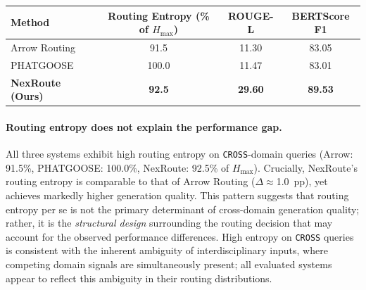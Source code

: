 \documentclass[a4paper,fleql]{cas-sc}
\begin{document}
\vspace{6pt plus 4pt minus 3pt}
\begin{center}
\begingroup
{}
\label{tab:moe_routing}
\renewcommand{\arraystretch}{1.3}
\begin{tabular}{lccc}
\toprule
\textbf{Method} & \textbf{Routing Entropy (\% of $H_{\max}$)} & \textbf{ROUGE-L} & \textbf{BERTScore F1} \\
\midrule
Arrow Routing~\citep{arrow2024routing}  & 91.5           & 11.30          & 83.05          \\
PHATGOOSE~\citep{muqeeth2024phatgoose}  & 100.0          & 11.47          & 83.01          \\
\midrule
\textbf{NexRoute (Ours)}               & \textbf{92.5}  & \textbf{29.60} & \textbf{89.53} \\
\bottomrule
\end{tabular}
\endgroup
\end{center}
\vspace{6pt plus 4pt minus 3pt}

\paragraph{Routing entropy does not explain the performance gap.}
All three systems exhibit high routing entropy on \texttt{CROSS}-domain queries
(Arrow: 91.5\%, PHATGOOSE: 100.0\%, NexRoute: 92.5\% of $H_{\max}$).
Crucially, NexRoute's routing entropy is comparable to that of Arrow Routing
($\Delta\approx$1.0~pp), yet achieves markedly higher generation quality.
This pattern suggests that routing entropy per se is not the primary
determinant of cross-domain generation quality; rather, it is the
\emph{structural design} surrounding the routing decision that may account
for the observed performance differences. High entropy on \texttt{CROSS}
queries is consistent with the inherent ambiguity of interdisciplinary inputs,
where competing domain signals are simultaneously present; all evaluated
systems appear to reflect this ambiguity in their routing distributions.
\end{document}
